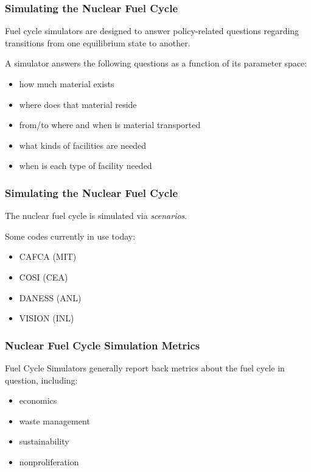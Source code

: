
\begin{frame}[ctb!]
  \frametitle{Simulating the Nuclear Fuel Cycle} 

  Fuel cycle simulators are designed to answer policy-related questions
  regarding transitions from one equilibrium state to another.

  \vspace{0.2cm}

  \pause
  A simulator answers the following questions as a function of its 
  parameter space:
  \begin{itemize}
    \item how much material exists
    \item where does that material reside
    \item from/to where and when is material transported
    \item what kinds of facilities are needed
    \item when is each type of facility needed
  \end{itemize}
\end{frame}

\begin{frame}[ctb!]
  \frametitle{Simulating the Nuclear Fuel Cycle}
  The nuclear fuel cycle is simulated via \textit{scenarios}.

  Some codes currently in use today:
  \begin{itemize}
    \item CAFCA (MIT) \cite{busquim_e_silva_system_2008}
    \item COSI (CEA) \cite{boucher_cosi:_2006}
    \item DANESS (ANL) \cite{durpel_daness_2003}
    \item VISION (INL) \cite{yacout_vision_2006}
  \end{itemize}
\end{frame}

\begin{frame}[ctb!]
  \frametitle{Nuclear Fuel Cycle Simulation Metrics}

  Fuel Cycle Simulators generally report back metrics about the fuel cycle in
  question, including:

  \begin{itemize}
    \item economics
    \item waste management
    \item sustainability
    \item nonproliferation
  \end{itemize}
\end{frame}

